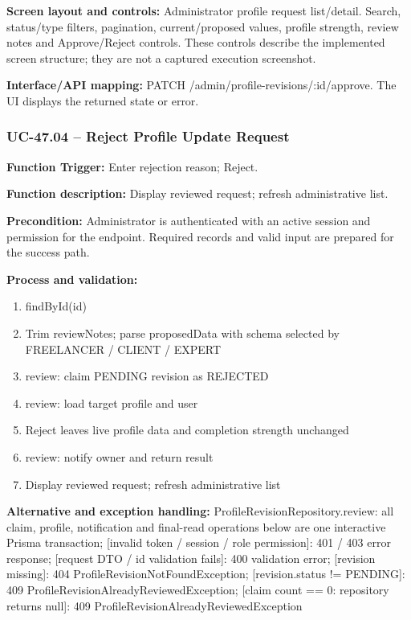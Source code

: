 \textbf{Screen layout and controls:} Administrator profile request list/\allowbreak{}detail. Search, status/\allowbreak{}type filters, pagination, current/\allowbreak{}proposed values, profile strength, review notes and Approve/\allowbreak{}Reject controls. These controls describe the implemented screen structure; they are not a captured execution screenshot.

\textbf{Interface/\allowbreak{}API mapping:} PATCH /\allowbreak{}admin/\allowbreak{}profile-revisions/\allowbreak{}:id/\allowbreak{}approve. The UI displays the returned state or error.

\subsubsection{UC-47.04 -- Reject Profile Update Request}
\textbf{Function Trigger:} Enter rejection reason; Reject.

\textbf{Function description:} Display reviewed request; refresh administrative list.

\textbf{Precondition:} Administrator is authenticated with an active session and permission for the endpoint. Required records and valid input are prepared for the success path.

\textbf{Process and validation:}
\begin{enumerate}
\item find\allowbreak{}By\allowbreak{}Id(id)
\item Trim review\allowbreak{}Notes; parse proposed\allowbreak{}Data with schema selected by FREELANCER /\allowbreak{} CLIENT /\allowbreak{} EXPERT
\item review: claim PENDING revision as REJECTED
\item review: load target profile and user
\item Reject leaves live profile data and completion strength unchanged
\item review: notify owner and return result
\item Display reviewed request; refresh administrative list
\end{enumerate}
\textbf{Alternative and exception handling:} Profile\allowbreak{}Revision\allowbreak{}Repository.review: all claim, profile, notification and final-read operations below are one interactive Prisma transaction; [invalid token /\allowbreak{} session /\allowbreak{} role permission]: 401 /\allowbreak{} 403 error response; [request DTO /\allowbreak{} id validation fails]: 400 validation error; [revision missing]: 404 Profile\allowbreak{}Revision\allowbreak{}Not\allowbreak{}Found\allowbreak{}Exception; [revision.status !=\allowbreak{} PENDING]: 409 Profile\allowbreak{}Revision\allowbreak{}Already\allowbreak{}Reviewed\allowbreak{}Exception; [claim count =\allowbreak{}=\allowbreak{} 0: repository returns null]: 409 Profile\allowbreak{}Revision\allowbreak{}Already\allowbreak{}Reviewed\allowbreak{}Exception

